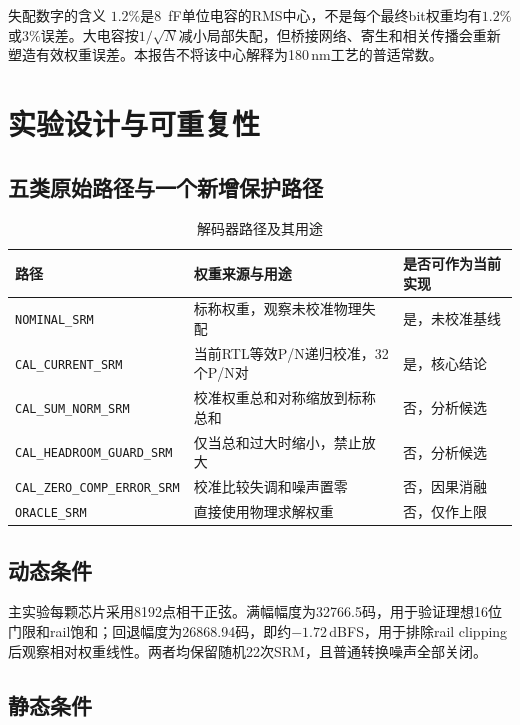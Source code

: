 \documentclass[11pt,a4paper,UTF8,fontset=none,openany]{ctexrep}
\numberwithin{equation}{chapter}
\numberwithin{figure}{chapter}
\numberwithin{table}{chapter}
\begin{document}
\begin{riskbox}{失配数字的含义}
$1.2\%$是\SI{8}{fF}单位电容的RMS中心，不是每个最终bit权重均有$1.2\%$或$3\%$误差。大电容按$1/\sqrt{N}$减小局部失配，但桥接网络、寄生和相关传播会重新塑造有效权重误差。本报告不将该中心解释为180\,nm工艺的普适常数。
\end{riskbox}

\chapter{实验设计与可重复性}

\section{五类原始路径与一个新增保护路径}

\begin{table}[htbp]
\centering\scriptsize
\caption{解码器路径及其用途}
\begin{tabularx}{\textwidth}{p{}X p{}}
\toprule
路径 & 权重来源与用途 & 是否可作为当前实现 \\
\midrule
\texttt{NOMINAL\_SRM} & 标称权重，观察未校准物理失配 & 是，未校准基线 \\
\texttt{CAL\_CURRENT\_SRM} & 当前RTL等效P/N递归校准，32个P/N对 & 是，核心结论 \\
\texttt{CAL\_SUM\_NORM\_SRM} & 校准权重总和对称缩放到标称总和 & 否，分析候选 \\
\texttt{CAL\_HEADROOM\_GUARD\_SRM} & 仅当总和过大时缩小，禁止放大 & 否，分析候选 \\
\texttt{CAL\_ZERO\_COMP\_ERROR\_SRM} & 校准比较失调和噪声置零 & 否，因果消融 \\
\texttt{ORACLE\_SRM} & 直接使用物理求解权重 & 否，仅作上限 \\
\bottomrule
\end{tabularx}
\end{table}

\section{动态条件}

主实验每颗芯片采用8192点相干正弦。满幅幅度为32766.5码，用于验证理想16位门限和rail饱和；回退幅度为26868.94码，即约$-1.72$\,dBFS，用于排除rail clipping后观察相对权重线性。两者均保留随机22次SRM，且普通转换噪声全部关闭。

\section{静态条件}
\end{document}
